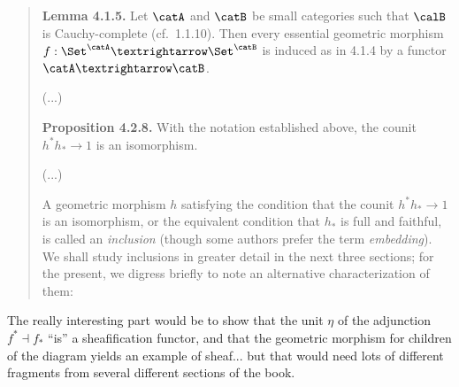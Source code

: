 \documentclass[oneside,12pt]{article}
\begin{document}
\begin{quotation}
  \ssk


  {\bf Lemma 4.1.5.} Let $\catA$ and $\catB$ be small categories such
  that $\calB$ is Cauchy-complete (cf.\ 1.1.10). Then every essential
  geometric morphism $f: \Set^\catA → \Set^\catB$ is induced as in
  4.1.4 by a functor $\catA → \catB$.

  \msk

  (...)

  \msk


  {\bf Proposition 4.2.8.} With the notation established above, the counit
  $h^*h_*→1$ is an isomorphism.

  (...)

  A geometric morphism $h$ satisfying the condition that the counit
  $h^*h_*→1$ is an isomorphism, or the equivalent condition that $h_*$
  is full and faithful, is called an {\sl inclusion} (though some
  authors prefer the term {\sl embedding}). We shall study inclusions
  in greater detail in the next three sections; for the present, we
  digress briefly to note an alternative characterization of them:


\end{quotation}

The really interesting part would be to show that the unit $η$ of the
adjunction $f^*⊣f_*$ ``is'' a sheafification functor, and that the
geometric morphism for children of the diagram yields an example of
sheaf... but that would need lots of different fragments from several
different sections of the book.




%                                                                             
\end{document}
